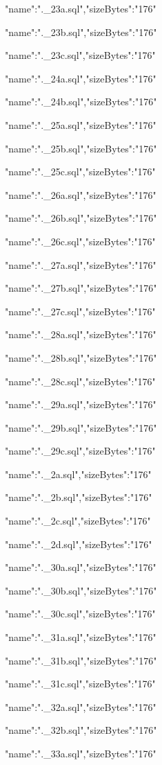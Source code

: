 \documentclass[11pt,a4paper]{article}
\begin{document}
{"name":".\_23a.sql","sizeBytes":"176"}

{"name":".\_23b.sql","sizeBytes":"176"}

{"name":".\_23c.sql","sizeBytes":"176"}

{"name":".\_24a.sql","sizeBytes":"176"}

{"name":".\_24b.sql","sizeBytes":"176"}

{"name":".\_25a.sql","sizeBytes":"176"}

{"name":".\_25b.sql","sizeBytes":"176"}

{"name":".\_25c.sql","sizeBytes":"176"}

{"name":".\_26a.sql","sizeBytes":"176"}

{"name":".\_26b.sql","sizeBytes":"176"}

{"name":".\_26c.sql","sizeBytes":"176"}

{"name":".\_27a.sql","sizeBytes":"176"}

{"name":".\_27b.sql","sizeBytes":"176"}

{"name":".\_27c.sql","sizeBytes":"176"}

{"name":".\_28a.sql","sizeBytes":"176"}

{"name":".\_28b.sql","sizeBytes":"176"}

{"name":".\_28c.sql","sizeBytes":"176"}

{"name":".\_29a.sql","sizeBytes":"176"}

{"name":".\_29b.sql","sizeBytes":"176"}

{"name":".\_29c.sql","sizeBytes":"176"}

{"name":".\_2a.sql","sizeBytes":"176"}

{"name":".\_2b.sql","sizeBytes":"176"}

{"name":".\_2c.sql","sizeBytes":"176"}

{"name":".\_2d.sql","sizeBytes":"176"}

{"name":".\_30a.sql","sizeBytes":"176"}

{"name":".\_30b.sql","sizeBytes":"176"}

{"name":".\_30c.sql","sizeBytes":"176"}

{"name":".\_31a.sql","sizeBytes":"176"}

{"name":".\_31b.sql","sizeBytes":"176"}

{"name":".\_31c.sql","sizeBytes":"176"}

{"name":".\_32a.sql","sizeBytes":"176"}

{"name":".\_32b.sql","sizeBytes":"176"}

{"name":".\_33a.sql","sizeBytes":"176"}
\end{document}
